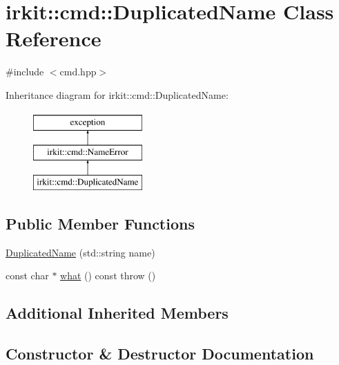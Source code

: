 \hypertarget{classirkit_1_1cmd_1_1DuplicatedName}{}\section{irkit\+:\+:cmd\+:\+:Duplicated\+Name Class Reference}
\label{classirkit_1_1cmd_1_1DuplicatedName}


{\ttfamily \#include $<$cmd.\+hpp$>$}

Inheritance diagram for irkit\+:\+:cmd\+:\+:Duplicated\+Name\+:\begin{figure}[H]
\begin{center}
\leavevmode
\includegraphics[height=3.000000cm]{classirkit_1_1cmd_1_1DuplicatedName}
\end{center}
\end{figure}
\subsection*{Public Member Functions}
\begin{DoxyCompactItemize}
\item 
\mbox{\hyperlink{classirkit_1_1cmd_1_1DuplicatedName_aa57c96af6aad5e89bc7080c0acb5a158}{Duplicated\+Name}} (std\+::string name)
\item 
const char $\ast$ \mbox{\hyperlink{classirkit_1_1cmd_1_1DuplicatedName_ac6e2ef55f050af443892cc165ee94953}{what}} () const  throw ()
\end{DoxyCompactItemize}
\subsection*{Additional Inherited Members}


\subsection{Constructor \& Destructor Documentation}
\mbox{\label{classirkit_1_1cmd_1_1DuplicatedName_aa57c96af6aad5e89bc7080c0acb5a158}} 
